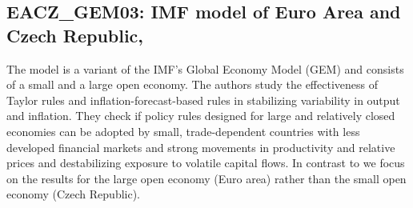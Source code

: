 \documentclass[11pt,a4paper]{article}
\begin{document}
	\subsection{EACZ\_GEM03: IMF model of Euro Area and Czech Republic, \cite{LaxtonPesenti2003}}
	\label{EACZGEM03}
	The model is a variant of the IMF's Global Economy Model (GEM) and consists of a small and a large open economy.
	The authors study the effectiveness of Taylor rules and inflation-forecast-based rules in stabilizing variability in output and inflation. They check if policy rules designed for large and relatively closed economies can be adopted by small, trade-dependent countries with less developed financial markets and strong movements in productivity and relative prices and destabilizing exposure to volatile capital flows. In contrast to \cite{LaxtonPesenti2003} we focus on the results for the large open economy (Euro area) rather than the small open economy (Czech Republic).
\end{document}
